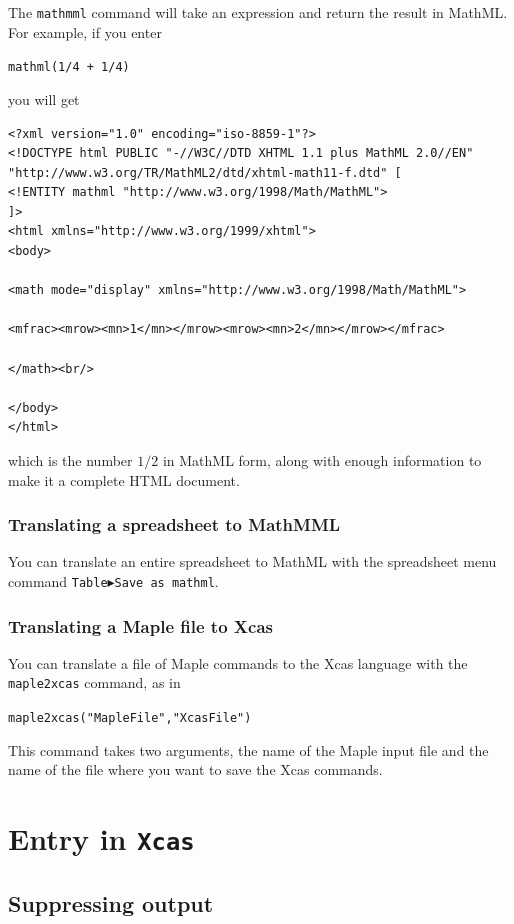 \documentclass[a4paper,11pt]{book}
\begin{document}
The \texttt{mathmml} command will take an expression
and return the result in MathML.  For example, if you enter
\begin{center}
  {\tt mathml(1/4 + 1/4)}
\end{center}
you will get
\begin{verbatim}
<?xml version="1.0" encoding="iso-8859-1"?>
<!DOCTYPE html PUBLIC "-//W3C//DTD XHTML 1.1 plus MathML 2.0//EN"
"http://www.w3.org/TR/MathML2/dtd/xhtml-math11-f.dtd" [
<!ENTITY mathml "http://www.w3.org/1998/Math/MathML">
]>
<html xmlns="http://www.w3.org/1999/xhtml">
<body>

<math mode="display" xmlns="http://www.w3.org/1998/Math/MathML">

<mfrac><mrow><mn>1</mn></mrow><mrow><mn>2</mn></mrow></mfrac>

</math><br/>

</body>
</html>
\end{verbatim}
which is the number $1/2$ in MathML form, along with enough
information to make it a complete HTML document.

\subsection{Translating a spreadsheet to MathMML}

You can translate an entire spreadsheet to MathML with the spreadsheet
menu command \texttt{Table$\blacktriangleright$Save as mathml}.

\subsection{Translating a Maple file to Xcas}

You can translate a file of Maple commands to the Xcas language with
the \texttt{maple2xcas} command, as in
\begin{center}
  {\tt maple2xcas("MapleFile","XcasFile")}
\end{center}
This command takes two arguments, the name of the Maple input file and
the name of the file where you want to save the Xcas commands.

\chapter{Entry in \texttt{Xcas}}

\section{Suppressing output}
\end{document}
